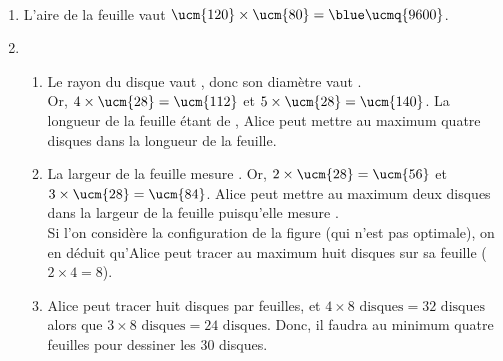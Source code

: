 \ \\ [-5mm]
   \begin{enumerate}
      \item L'aire de la feuille vaut $\ucm{120}\times\ucm{80} ={\blue \ucmq{9600}}$.
      \item
         \begin{enumerate}
            \item Le rayon du disque vaut , donc son diamètre vaut . \\
               Or, $4\times\ucm{28} =\ucm{112}$ et $5\times\ucm{28} =\ucm{140}$. La longueur de la feuille étant de , {\blue Alice peut mettre au maximum quatre disques dans la longueur de la feuille}.
            \item La largeur de la feuille mesure . Or, $2\times\ucm{28} =\ucm{56}$ et $3\times\ucm{28} =\ucm{84}$. Alice peut mettre au maximum deux disques dans la largeur de la feuille puisqu'elle mesure . \\
               Si l'on considère la configuration de la figure (qui n'est pas optimale), on en déduit qu'{\blue Alice peut tracer au maximum huit disques sur sa feuille} ($2\times4 =8$).
            \item Alice peut tracer huit disques par feuilles, et $4\times8\text{ disques} =32\text{ disques}$ alors que $3\times8\text{ disques} =24\text{ disques}$. Donc, {\blue il faudra au minimum quatre feuilles pour dessiner les 30 disques}.
         \end{enumerate}
   \end{enumerate}

\Coupe

